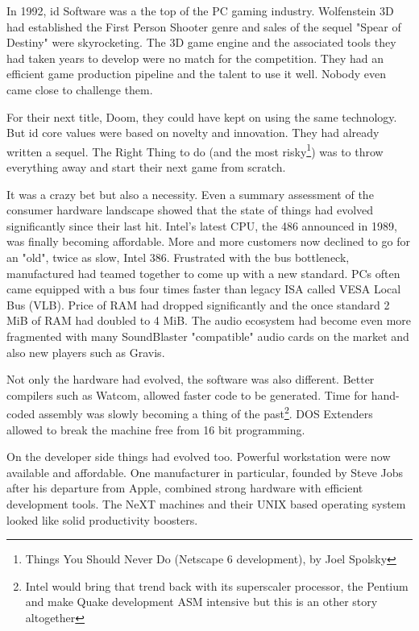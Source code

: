 In 1992, id Software was a the top of the PC gaming industry. Wolfenstein 3D had established the First
Person Shooter genre and sales of the sequel "Spear of Destiny" were skyrocketing. The 3D game engine and the associated 
tools they had taken years to develop were no match for the competition. They had an efficient game production pipeline and the talent to use it well. Nobody even came close to challenge them.\\
\par
For their next title, Doom, they could have kept on using the same technology. But id core values were based on novelty and innovation. They had already written a sequel. The Right Thing to do (and the most risky\footnote{Things You Should Never Do (Netscape 6 development), by Joel Spolsky}) was to throw everything away and start their next game from scratch.\\
\par
It was a crazy bet but also a necessity. Even a summary assessment of the consumer hardware landscape showed that the state of things had evolved significantly since their last hit. Intel's latest CPU, the 486 announced in 1989, was finally becoming affordable. More and more customers now declined to go for an "old", twice as slow, Intel 386. Frustrated with the bus bottleneck, manufactured had teamed together to come up with a new standard. PCs often came equipped with a bus four times faster than legacy ISA called VESA Local Bus (VLB). Price of RAM had dropped significantly and the once standard 2 MiB of RAM had doubled to 4 MiB. The audio ecosystem had become even more fragmented with many SoundBlaster "compatible" audio cards on the market and also new players such as Gravis.\\
 \par 
 Not only the hardware had evolved, the software was also different. Better compilers such as Watcom, allowed faster code to be generated. Time for hand-coded assembly was slowly becoming a thing of the past\footnote{Intel would bring that trend back with its superscaler processor, the Pentium and make Quake development ASM intensive but this is an other story altogether}. DOS Extenders allowed to break the machine free from 16 bit programming.\\
 \par
 On the developer side things had evolved too. Powerful workstation were now available and affordable. One manufacturer in particular, founded by Steve Jobs after his departure from Apple, combined strong hardware with efficient development tools. The NeXT machines and their UNIX based operating system looked like solid productivity boosters.\\
